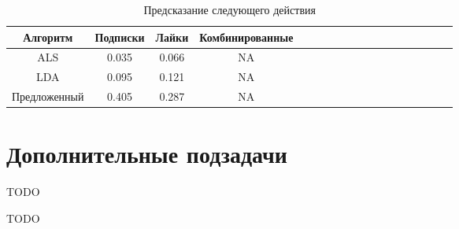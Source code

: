 \documentclass[times,specification,annotation]{itmo-student-thesis}
\begin{document}
\begin{table}[!h]
\caption{Предсказание следующего действия} \label{tab2-next-action}
\centering
\begin{tabular}{|*{18}{c|}}\hline
Алгоритм & Подписки & Лайки & Комбинированные \\\hline
ALS                        & 0.035 & 0.066  & NA \\\hline
LDA                       & 0.095 & 0.121  & NA\\\hline
Предложенный & 0.405 & 0.287 & NA \\\hline
\end{tabular}
\end{table}

\section{Дополнительные подзадачи}

TODO

\startconclusionpage

TODO

\printmainbibliography

\appendix
\end{document}
